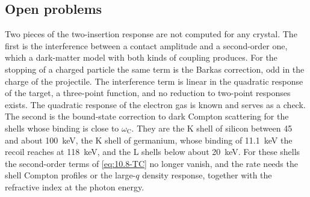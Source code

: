 \subsection{Open problems}\label{sec:10.8-open}

Two pieces of the two-insertion response are not computed for any crystal. The first is the interference between a contact amplitude and a second-order one, which a dark-matter model with both kinds of coupling produces. For the stopping of a charged particle the same term is the Barkas correction, odd in the charge of the projectile. The interference term is linear in the quadratic response of the target, a three-point function, and no reduction to two-point responses exists. The quadratic response of the electron gas is known and serves as a check. The second is the bound-state correction to dark Compton scattering for the shells whose binding is close to $\omega_{\mathrm{C}}$. They are the K shell of silicon between 45 and about \SI{100}{keV}, the K shell of germanium, whose binding of \SI{11.1}{keV} the recoil reaches at \SI{118}{keV}, and the L shells below about \SI{20}{keV}. For these shells the second-order terms of \cref{eq:10.8-TC} no longer vanish, and the rate needs the shell Compton profiles or the large-$q$ density response, together with the refractive index at the photon energy.
